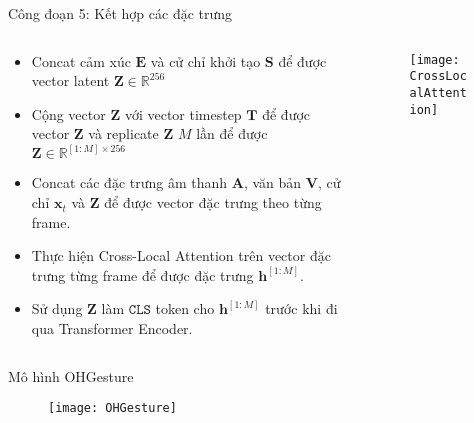 \begin{frame}{Công đoạn 5: Kết hợp các đặc trưng}
	\begin{columns}
		\begin{column}{0.5\textwidth}
				\begin{itemize}
					\item Concat cảm xúc $\mathbf{E}$ và cử chỉ khởi tạo $\mathbf{S}$ để được vector latent $\mathbf{Z} \in \mathbb{R}^{256}$
					\item Cộng vector $\mathbf{Z}$ với vector timestep $\mathbf{T}$ để được vector $\mathbf{Z}$ và replicate $\mathbf{Z}$ $M$ lần để được $\mathbf{Z} \in \mathbb{R}^{[1:M] \times 256}$
					\item Concat các đặc trưng âm thanh $\mathbf{A}$, văn bản $\mathbf{V}$, cử chỉ $\mathbf{x}_{t}$ và $\mathbf{Z}$ để được vector đặc trưng theo từng frame.
					\item Thực hiện Cross-Local Attention trên vector đặc trưng từng frame để được đặc trưng $\mathbf{h}^{[1:M]}$.
					\item Sử dụng $\mathbf{Z}$ làm $\texttt{CLS}$ token cho $\mathbf{h}^{[1:M]}$ trước khi đi qua Transformer Encoder.
				\end{itemize}
				
		\end{column}
		
		\begin{column}{0.5\textwidth}
		\begin{figure}
				\centering
				\texttt{[image: CrossLocalAttention]}
			\end{figure}
	\end{column}
	\end{columns}
\end{frame}

\begin{frame}{Mô hình OHGesture}
	\begin{figure}
		\centering
		\texttt{[image: OHGesture]}
	\end{figure}
\end{frame}






